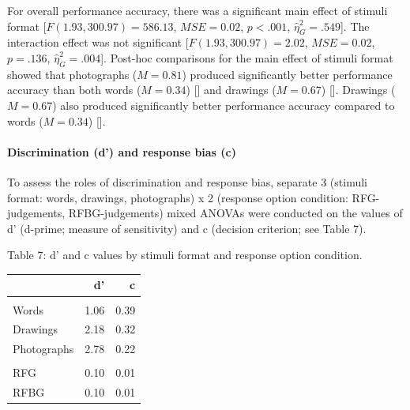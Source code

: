 \documentclass[
  11pt,
]{article}
\begin{document}
For overall performance accuracy, there was a significant main effect of
stimuli format {[}\(F(1.93, 300.97) = 586.13\), \(\mathit{MSE} = 0.02\),
\(p < .001\), \(\hat{\eta}^2_G = .549\){]}. The interaction effect was
not significant {[}\(F(1.93, 300.97) = 2.02\), \(\mathit{MSE} = 0.02\),
\(p = .136\), \(\hat{\eta}^2_G = .004\){]}. Post-hoc comparisons for the
main effect of stimuli format showed that photographs (\(M = 0.81\))
produced significantly better performance accuracy than both words
(\(M = 0.34\)) {[}{]} and drawings (\(M = 0.67\)) {[}{]}. Drawings
(\(M = 0.67\)) also produced significantly better performance accuracy
compared to words (\(M = 0.34\)) {[}{]}.

\hypertarget{discrimination-d-and-response-bias-c}{%
\paragraph{Discrimination (d') and response bias
(c)}\label{discrimination-d-and-response-bias-c}}

To assess the roles of discrimination and response bias, separate 3
(stimuli format: words, drawings, photographs) x 2 (response option
condition: RFG-judgements, RFBG-judgements) mixed ANOVAs were conducted
on the values of d' (d-prime; measure of sensitivity) and c (decision
criterion; see Table 7).

Table 7: d' and c values by stimuli format and response option
condition.

\begin{table}[!h]
\centering
\begin{tabular}{>{\raggedright\arraybackslash}p{4cm}rr}
\toprule
  & d' & c\\
\midrule
\addlinespace[0.3em]
\multicolumn{3}{l}{\textbf{Stimuli format}}\\
\hspace{1em}Words & 1.06 & 0.39\\
\hspace{1em}Drawings & 2.18 & 0.32\\
\hspace{1em}Photographs & 2.78 & 0.22\\
\addlinespace[0.3em]
\multicolumn{3}{l}{\textbf{Response option}}\\
\hspace{1em}RFG & 0.10 & 0.01\\
\hspace{1em}RFBG & 0.10 & 0.01\\
\bottomrule
\end{tabular}
\end{table}
\end{document}
